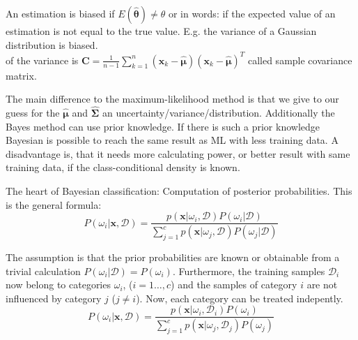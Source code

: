   An estimation is biased if $E(\boldsymbol{\hat{\theta}}) \neq \theta$ or in words: if the expected 
  value of an estimation is not equal to the true value.
  E.g. the variance of a Gaussian distribution is biased.\\
   of the variance is $\boldsymbol{C} = \frac1{n-1} \sum\limits_{k=1}^n 
  (\boldsymbol{x}_k - \boldsymbol{\hat{\mu}})(\boldsymbol{x}_k - \boldsymbol{\hat{\mu}})^T$ called sample covariance matrix.
  
  
  The main difference to the maximum-likelihood method is that we give to our guess for the $\boldsymbol{\hat{\mu}}$ and $\boldsymbol{\hat{\Sigma}}$ an 
   uncertainty\slash{}variance\slash{}distribution. Additionally the Bayes method can use prior knowledge. If there is such a prior knowledge Bayesian is possible 
   to reach the same result as ML with less training data. A disadvantage is, that it needs more calculating power, or better result with same training data, if the class-conditional density is known.
  
  The heart of Bayesian classification: Computation of posterior probabilities. This is the 
  general formula:
  $$P(\omega_i|\bm{x}, \mathcal{D}) = \frac{p(\bm{x}|\omega_i, \mathcal{D}) P(\omega_i|\mathcal{D})}
    {\sum\limits_{j=1}^{c} p(\bm{x}|\omega_j, \mathcal{D}) P(\omega_j|\mathcal{D})}$$
    
    
  The assumption is that the prior probabilities are known or obtainable from a trivial calculation $P(\omega_i|\mathcal{D})=P(\omega_i)$.
  Furthermore, the training samples $\mathcal{D}_i$ now belong to categories $\omega_i$, 
  ($i=1\ldots,c$) and the samples of category $i$ are not influenced by category $j$ ($j \neq i$).
  Now, each category can be treated indepently.
  $$P(\omega_i|\bm{x}, \mathcal{D}) = \frac{p(\bm{x}|\omega_i, \mathcal{D}_i) P(\omega_i)}
    {\sum\limits_{j=1}^{c} p(\bm{x}|\omega_j, \mathcal{D}_j) P(\omega_j)}$$
    
